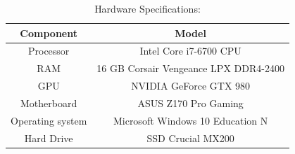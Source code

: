 \documentclass[conference]{IEEEtran}
\begin{document}
\begin{table}[htbp]
\caption{Hardware Specifications:}
\begin{center}
\begin{tabular}{|c|c|}
	\hline
	\textbf{Component} & \textbf{Model} \\
	\hline
	Processor & Intel Core i7-6700 CPU\\ \hline
	RAM & 16 GB Corsair Vengeance LPX DDR4-2400\\ \hline
	GPU & NVIDIA GeForce GTX 980 \\ \hline
	Motherboard & ASUS Z170 Pro Gaming \\ \hline
	Operating system & Microsoft Windows 10 Education N \\ \hline
	Hard Drive & SSD Crucial MX200 \\ \hline
\end{tabular}
\label{hardware}
\end{center}
\end{table}
\end{document}
